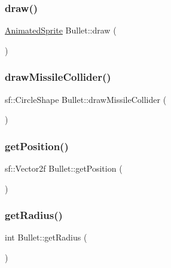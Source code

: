 \mbox{\label{class_bullet_abd80643d0485e32232ad46cc2087de40}} 
\subsubsection{\texorpdfstring{draw()}{draw()}}
{\footnotesize\ttfamily \hyperlink{class_animated_sprite}{Animated\+Sprite} Bullet\+::draw (\begin{DoxyParamCaption}{ }\end{DoxyParamCaption})}

\mbox{\label{class_bullet_ac8c9c18e09ff7ef97313aa0c805c9846}} 
\subsubsection{\texorpdfstring{draw\+Missile\+Collider()}{drawMissileCollider()}}
{\footnotesize\ttfamily sf\+::\+Circle\+Shape Bullet\+::draw\+Missile\+Collider (\begin{DoxyParamCaption}{ }\end{DoxyParamCaption})}

\mbox{\label{class_bullet_a64e4ce634f62ab31d338bd142c1987c9}} 
\subsubsection{\texorpdfstring{get\+Position()}{getPosition()}}
{\footnotesize\ttfamily sf\+::\+Vector2f Bullet\+::get\+Position (\begin{DoxyParamCaption}{ }\end{DoxyParamCaption})}

\mbox{\label{class_bullet_a781ca8ccaf366435ece65eacd79e8b44}} 
\subsubsection{\texorpdfstring{get\+Radius()}{getRadius()}}
{\footnotesize\ttfamily int Bullet\+::get\+Radius (\begin{DoxyParamCaption}{ }\end{DoxyParamCaption})}

